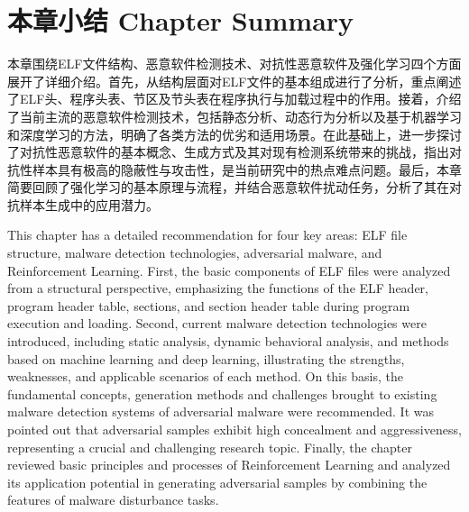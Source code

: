 \section{本章小结 Chapter Summary}

本章围绕ELF文件结构、恶意软件检测技术、对抗性恶意软件及强化学习四个方面展开了详细介绍。首先，从结构层面对ELF文件的基本组成进行了分析，重点阐述了ELF头、程序头表、节区及节头表在程序执行与加载过程中的作用。接着，介绍了当前主流的恶意软件检测技术，包括静态分析、动态行为分析以及基于机器学习和深度学习的方法，明确了各类方法的优劣和适用场景。在此基础上，进一步探讨了对抗性恶意软件的基本概念、生成方式及其对现有检测系统带来的挑战，指出对抗性样本具有极高的隐蔽性与攻击性，是当前研究中的热点难点问题。最后，本章简要回顾了强化学习的基本原理与流程，并结合恶意软件扰动任务，分析了其在对抗样本生成中的应用潜力。

This chapter has a detailed recommendation for four key areas: ELF file structure, malware detection technologies, adversarial malware, and Reinforcement Learning. First, the basic components of ELF files were analyzed from a structural perspective, emphasizing the functions of the ELF header, program header table, sections, and section header table during program execution and loading. Second, current malware detection technologies were introduced, including static analysis, dynamic behavioral analysis, and methods based on machine learning and deep learning, illustrating the strengths, weaknesses, and applicable scenarios of each method. On this basis, the fundamental concepts, generation methods and challenges brought to existing malware detection systems of adversarial malware were recommended. It was pointed out that adversarial samples exhibit high concealment and aggressiveness, representing a crucial and challenging research topic. Finally, the chapter reviewed basic principles and processes of Reinforcement Learning and analyzed its application potential in generating adversarial samples by combining the features of malware disturbance tasks.  
